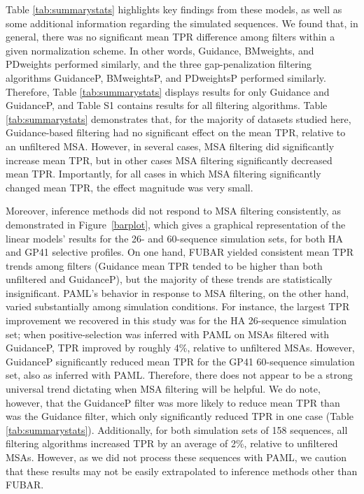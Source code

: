 \documentclass[11pt]{article}
\begin{document}
Table \ref{tab:summarystats} highlights key findings from these models, as well as some additional information regarding the simulated sequences. We found that, in general, there was no significant mean TPR difference among filters within a given normalization scheme. In other words, Guidance, BMweights, and PDweights performed similarly, and the three gap-penalization filtering algorithms GuidanceP, BMweightsP, and PDweightsP performed similarly. Therefore, Table \ref{tab:summarystats} displays results for only Guidance and GuidanceP, and Table S1 contains results for all filtering algorithms. Table \ref{tab:summarystats} demonstrates that, for the majority of datasets studied here, Guidance-based filtering had no significant effect on the mean TPR, relative to an unfiltered MSA. However, in several cases, MSA filtering did significantly increase mean TPR, but in other cases MSA filtering significantly decreased mean TPR. Importantly, for all cases in which MSA filtering significantly changed mean TPR, the effect magnitude was very small. 

Moreover, inference methods did not respond to MSA filtering consistently, as demonstrated in Figure~\ref{barplot}, which gives a graphical representation of the linear models' results for the 26- and 60-sequence simulation sets, for both HA and GP41 selective profiles. On one hand, FUBAR yielded consistent mean TPR trends among filters (Guidance mean TPR tended to be higher than both unfiltered and GuidanceP), but the majority of these trends are statistically insignificant. PAML's behavior in response to MSA filtering, on the other hand, varied substantially among simulation conditions. For instance, the largest TPR improvement we recovered in this study was for the HA 26-sequence simulation set; when positive-selection was inferred with PAML on MSAs filtered with GuidanceP, TPR improved by roughly 4\%, relative to unfiltered MSAs. However, GuidanceP significantly reduced mean TPR for the GP41 60-sequence simulation set, also as inferred with PAML. Therefore, there does not appear to be a strong universal trend dictating when MSA filtering will be helpful. We do note, however, that the GuidanceP filter was more likely to reduce mean TPR than was the Guidance filter, which only significantly reduced TPR in one case (Table \ref{tab:summarystats}). Additionally, for both simulation sets of 158 sequences, all filtering algorithms increased TPR by an average of 2\%, relative to unfiltered MSAs. However, as we did not process these sequences with PAML, we caution that these results may not be easily extrapolated to inference methods other than FUBAR.
\end{document}
